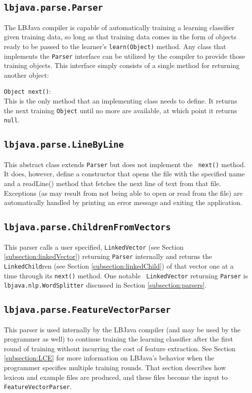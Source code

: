 \subsection{{\tt lbjava.parse.Parser}} \label{subsection:parser}
The LBJava compiler is capable of automatically training a learning classifier
given training data, so long as that training data comes in the form of
objects ready to be passed to the learner's {\tt learn(Object)} method.  Any
class that implements the {\tt Parser} interface can be utilized by the
compiler to provide those training objects.  This interface simply consists of
a single method for returning another object:

\begin{list}{}{}
\item[{\tt Object next()}:] ~\\
This is the only method that an implementing class needs to define.  It
returns the next training {\tt Object} until no more are available, at which
point it returns {\tt null}.
\end{list}

\subsection{{\tt lbjava.parse.LineByLine}} \label{subsection:lineByLine}
This abstract class extends {\tt Parser} but does not implement the {\tt
next()} method.  It does, however, define a constructor that opens the file
with the specified name and a readLine() method that fetches the next line of
text from that file.  Exceptions (as may result from not being able to open or
read from the file) are automatically handled by printing an error message and
exiting the application.

\subsection{{\tt lbjava.parse.ChildrenFromVectors}} \label{subsection:CFV}
This parser calls a user specified, {\tt LinkedVector} (see Section
\ref{subsection:linkedVector}) returning {\tt Parser} internally and returns
the {\tt LinkedChild}ren (see Section \ref{subsection:linkedChild}) of that
vector one at a time through its {\tt next()} method.  One notable {\tt
LinkedVector} returning {\tt Parser} is {\tt lbjava.nlp.WordSplitter} discussed
in Section \ref{subsection:parsers}.

\subsection{{\tt lbjava.parse.FeatureVectorParser}} \label{subsection:FVP}
This parser is used internally by the LBJava compiler (and may be used by the
programmer as well) to continue training the learning classifier after the
first round of training without incurring the cost of feature extraction.  See
Section \ref{subsection:LCE} for more information on LBJava's behavior when the
programmer specifies multiple training rounds.  That section describes how
lexicon and example files are produced, and these files become the input to
{\tt FeatureVectorParser}. \\

